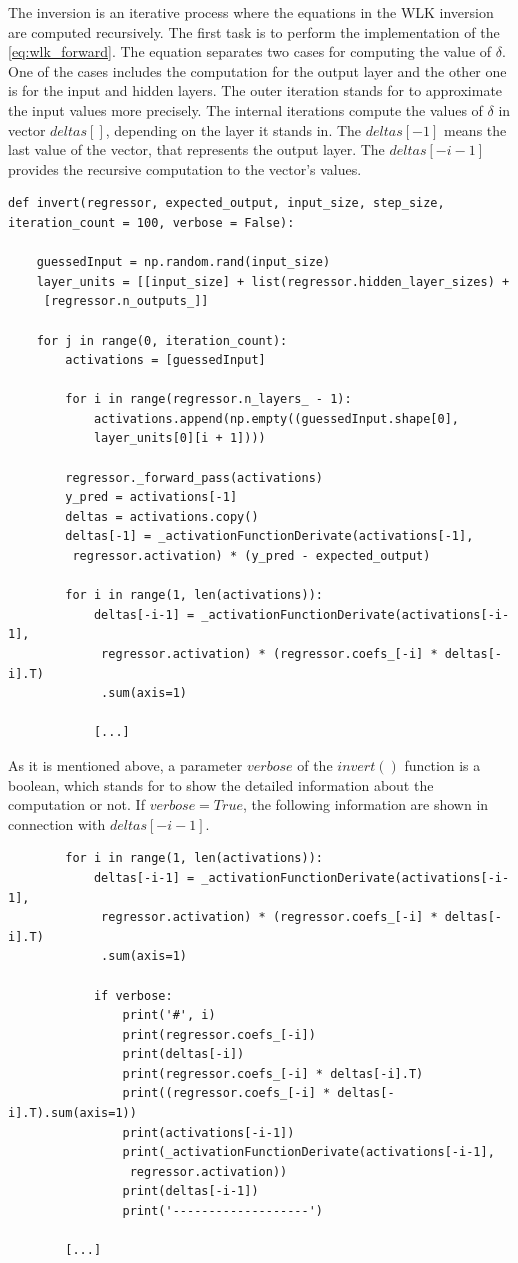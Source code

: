 The inversion is an iterative process where the equations in the WLK inversion are computed recursively. The first task is to perform the implementation of the \autoref{eq:wlk_forward}. The equation separates two cases for computing the value of $\delta$. One of the cases includes the computation for the output layer and the other one is for the input and hidden layers. The outer iteration stands for to approximate the input values more precisely. The internal iterations compute the values of $\delta$ in vector $deltas[]$, depending on the layer it stands in. The $deltas[-1]$ means the last value of the vector, that represents the output layer. The $deltas[-i-1]$ provides the recursive computation to the vector's values. 
\begin{lstlisting}
def invert(regressor, expected_output, input_size, step_size, iteration_count = 100, verbose = False):

	guessedInput = np.random.rand(input_size)
	layer_units = [[input_size] + list(regressor.hidden_layer_sizes) +
	 [regressor.n_outputs_]]
	 
	for j in range(0, iteration_count):
		activations = [guessedInput]
		
		for i in range(regressor.n_layers_ - 1):
			activations.append(np.empty((guessedInput.shape[0],
			layer_units[0][i + 1])))
			
		regressor._forward_pass(activations)
		y_pred = activations[-1]
		deltas = activations.copy()
		deltas[-1] = _activationFunctionDerivate(activations[-1],
		 regressor.activation) * (y_pred - expected_output)

		for i in range(1, len(activations)):
			deltas[-i-1] = _activationFunctionDerivate(activations[-i-1], 
			 regressor.activation) * (regressor.coefs_[-i] * deltas[-i].T)
			 .sum(axis=1)
			 
			[...]
\end{lstlisting}

As it is mentioned above, a parameter $verbose$ of the $invert()$ function is a boolean, which stands for to show the detailed information about the computation or not. If $verbose = True$, the following information are shown in connection with $deltas[-i-1]$.

\newpage

\begin{lstlisting}
		for i in range(1, len(activations)):
			deltas[-i-1] = _activationFunctionDerivate(activations[-i-1], 
			 regressor.activation) * (regressor.coefs_[-i] * deltas[-i].T)
			 .sum(axis=1)

			if verbose:
				print('#', i)
				print(regressor.coefs_[-i])
				print(deltas[-i])
				print(regressor.coefs_[-i] * deltas[-i].T)
				print((regressor.coefs_[-i] * deltas[-i].T).sum(axis=1))
				print(activations[-i-1])
				print(_activationFunctionDerivate(activations[-i-1],
				 regressor.activation))
				print(deltas[-i-1])
				print('-------------------')

		[...]
\end{lstlisting}

